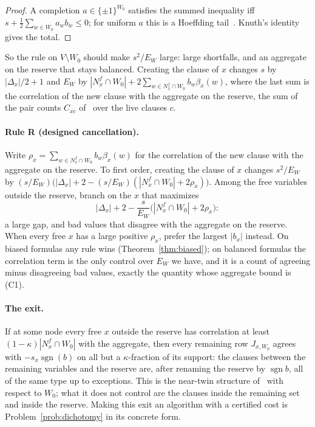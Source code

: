 \documentclass[11pt,a4paper]{article}
\theoremstyle{definition}
\theoremstyle{remark}
\newcommand{\sgn}{\operatorname{sgn}}
\begin{document}
\begin{proof}
A completion $a\in\{\pm1\}^{W_0}$ satisfies the summed inequality iff
$s+\frac12\sum_{w\in W_0}a_wb_w\le0$; for uniform $a$ this is a Hoeffding
tail~\cite[Lemma~1]{CC}. Knuth's identity gives the total.
\end{proof}

So the rule on $V\setminus W_0$ should make $s^2/E_W$ large: large shortfalls,
and an aggregate on the reserve that stays balanced. Creating the clause of
$x$ changes $s$ by $|\Delta_x|/2+1$ and $E_W$ by
$|N^f_x\cap W_0|+2\sum_{w\in N^f_x\cap W_0}b_w\beta_x(w)$, where the last sum
is the correlation of the new clause with the aggregate on the reserve, the sum
of the pair counts $C_{xc}$ of~\cite[(1)]{CC} over the live clauses $c$.

\paragraph{Rule R (designed cancellation).} Write
$\rho_x=\sum_{w\in N^f_x\cap W_0}b_w\beta_x(w)$ for the correlation of the new
clause with the aggregate on the reserve. To first order, creating the clause
of $x$ changes $s^2/E_W$ by $(s/E_W)\bigl(|\Delta_x|+2-(s/E_W)(|N^f_x\cap W_0|+2\rho_x)\bigr)$.
Among the free variables outside the reserve, branch on the $x$ that
maximizes
\[
 |\Delta_x|+2-\frac{s}{E_W}\bigl(|N^f_x\cap W_0|+2\rho_x\bigr):
\]
a large gap, and bad values that disagree with the aggregate on the reserve.
When every free $x$ has a large positive $\rho_x$, prefer the largest $|b_x|$
instead. On biased formulas any rule wins (Theorem~\ref{thm:biased}); on
balanced formulas the correlation term is the only control over $E_W$ we
have, and it is a count of agreeing minus disagreeing bad values, exactly the
quantity whose aggregate bound is (C1).

\paragraph{The exit.} If at some node every free $x$ outside the reserve has
correlation at least $(1-\kappa)|N^f_x\cap W_0|$ with the aggregate, then every
remaining row $J_{x,W_0}$ agrees with $-s_x\sgn(b)$ on all but a
$\kappa$-fraction of its support: the clauses between the remaining variables
and the reserve are, after renaming the reserve by $\sgn b$, all of the same
type up to exceptions. This is the near-twin structure of~\cite{NT} with
respect to $W_0$; what it does not control are the clauses inside the
remaining set and inside the reserve. Making this exit an algorithm with a
certified cost is Problem~\ref{prob:dichotomy} in its concrete form.
\end{document}
